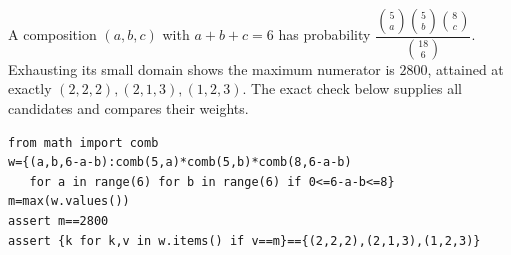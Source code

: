 A composition $(a,b,c)$ with $ a+b+c=6 $ has probability $\dfrac{\binom5a\binom5b\binom8c}{\binom{18}{6}}$. Exhausting its small domain shows the maximum numerator is $ 2800 $, attained at exactly $\boxed{(2,2,2),(2,1,3),(1,2,3)}$. The exact check below supplies all candidates and compares their weights.
\begin{verbatim}
from math import comb
w={(a,b,6-a-b):comb(5,a)*comb(5,b)*comb(8,6-a-b)
   for a in range(6) for b in range(6) if 0<=6-a-b<=8}
m=max(w.values())
assert m==2800
assert {k for k,v in w.items() if v==m}=={(2,2,2),(2,1,3),(1,2,3)}
\end{verbatim}
